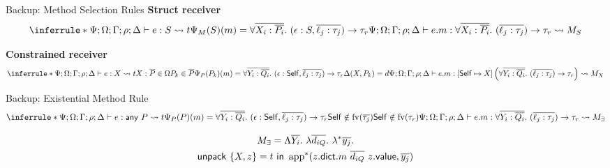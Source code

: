 \begin{frame}{Backup: Method Selection Rules}
\scriptsize
\textbf{Struct receiver}
\[
\inferrule*
  {
    \ectx \has e:S \elab t
    \\
    \Psi_M(S)(m)=
      \ftype{\overline{X_i:\overline{P_i}}}
             {\epsilon:S,\overline{\ell_j:\tau_j}}
             {\tau_r}
  }
  {
    \ectx \has e.m:
      \ftype{\overline{X_i:\overline{P_i}}}
             {\overline{\ell_j:\tau_j}}
             {\tau_r}
      \elab M_S
  }
\]

\textbf{Constrained receiver}
\[
\inferrule*
  {
    \ectx \has e:X \elab t
    \\
    X:\overline{P}\in\Omega
    \\
    P_k\in\overline{P}
    \\
    \Psi_P(P_k)(m)=
      \ftype{\overline{Y_i:\overline{Q_i}}}
             {\epsilon:\Self,\overline{\ell_j:\tau_j}}
             {\tau_r}
    \\
    \Delta(X,P_k)=d
  }
  {
    \ectx \has e.m:
      [\Self\mapsto X]
      \left(\ftype{\overline{Y_i:\overline{Q_i}}}
               {\overline{\ell_j:\tau_j}}
               {\tau_r}\right)
      \elab M_X
  }
\]
\end{frame}

\begin{frame}{Backup: Existential Method Rule}
\scriptsize
\[
\inferrule*
  {
    \ectx \has e:\Any{P}\elab t
    \\
    \Psi_P(P)(m)=
      \ftype{\overline{Y_i:\overline{Q_i}}}
             {\epsilon:\Self,\overline{\ell_j:\tau_j}}
             {\tau_r}
    \\
    \Self\notin\fv(\overline{\tau_j})
    \\
    \Self\notin\fv(\tau_r)
  }
  {
    \ectx \has e.m:
      \ftype{\overline{Y_i:\overline{Q_i}}}
             {\overline{\ell_j:\tau_j}}
             {\tau_r}
      \elab M_{\exists}
  }
\]

\[
\begin{gathered}
M_{\exists} =
  \Lambda\overline{Y_i}.\
  \lambda\overline{d_{iQ}}.\
  \lambda^{*}\overline{y_j}.\\
  \mathsf{unpack}\ \{X,z\}=t\ \mathsf{in}\
  \operatorname{app}^{*}(
    z.\mathsf{dict}.m\ \overline{d_{iQ}}\ z.\mathsf{value},
    \overline{y_j})
\end{gathered}
\]
\end{frame}

